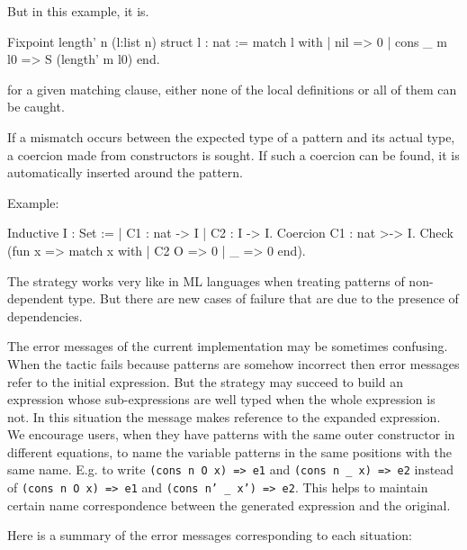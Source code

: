 But in this example, it is.

\begin{coq_example}
Fixpoint length' n (l:list n) {struct l} : nat :=
  match l with
  | nil => 0
  | cons _ m l0 => S (length' m l0)
  end.
\end{coq_example}

\Rem for a given matching clause, either none of the local
definitions or all of them can be caught.


If a mismatch occurs between the expected type of a pattern and its
actual type, a coercion made from constructors is sought. If such a
coercion can be found, it is automatically inserted around the
pattern.

Example:

\begin{coq_example}
Inductive I : Set :=
  | C1 : nat -> I
  | C2 : I -> I.
Coercion C1 : nat >-> I.
Check (fun x => match x with
                | C2 O => 0
                | _ => 0
                end).
\end{coq_example}


\label{limitations}
The strategy works very like in ML languages when treating
patterns of non-dependent type.  
But there are new cases of failure that are due to the presence of 
dependencies. 

The error messages of the current implementation may be sometimes
confusing.  When the tactic fails because patterns are somehow
incorrect then error messages refer to the initial expression. But the
strategy may succeed to build an expression whose sub-expressions are
well typed when the whole expression is not. In this situation the
message makes reference to the expanded expression.  We encourage
users, when they have patterns with the same outer constructor in
different equations, to name the variable patterns in the same
positions with the same name.  
E.g. to write {\small\texttt{(cons n O x) => e1}} 
and {\small\texttt{(cons n \_ x) => e2}} instead of
{\small\texttt{(cons n O x) => e1}} and 
{\small\texttt{(cons n' \_ x') => e2}}. 
This helps to maintain certain name correspondence between the
generated expression and the original.

Here is a summary of the error messages corresponding to each situation:

